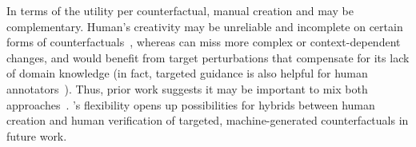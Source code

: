 In terms of the utility per counterfactual, manual creation and \sysname may be complementary. 
Human's creativity may be unreliable and incomplete on certain forms of counterfactuals~\cite{ribeiro2018semantically}, whereas \sysname can miss more complex or context-dependent changes, and would benefit from target perturbations that compensate for its lack of domain knowledge (in fact, targeted guidance is also helpful for human annotators~\cite{huang2020counterfactually}).
Thus, prior work suggests it may be important to mix both approaches~\cite{Khashabi2020MoreBF}.
\sysname's flexibility opens up possibilities for hybrids between human creation and human verification of targeted, machine-generated counterfactuals in future work.





